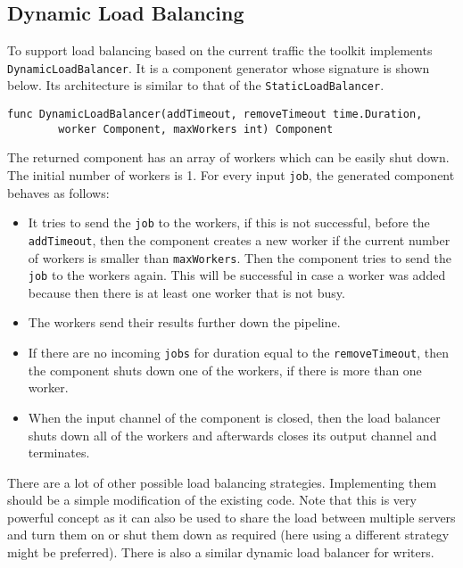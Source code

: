 \subsection{Dynamic Load Balancing}
To support load balancing based on the current traffic the toolkit implements
\texttt{DynamicLoadBalancer}. It is a component generator whose signature is
shown below. Its architecture is similar
to that of the \texttt{StaticLoadBalancer}.
\begin{lstlisting}
func DynamicLoadBalancer(addTimeout, removeTimeout time.Duration, 
        worker Component, maxWorkers int) Component
\end{lstlisting}
The returned component has an array of workers which can be easily shut down.
The initial number of workers is 1. 
For every input \texttt{job}, the generated component behaves as follows:
\begin{itemize}
	\item It tries to send the \texttt{job} to the workers, if this is not
          successful, before the \texttt{addTimeout}, then the component 
          creates a new worker if the current number of workers is smaller 
          than \texttt{maxWorkers}. Then the component tries to send the 
          \texttt{job} to the workers again. This will be successful in 
          case a worker was added because then there is at least one 
          worker that is not busy.

	\item The workers send their results further down the pipeline.

	\item If there are no incoming \texttt{jobs} for duration equal to the 
          \texttt{removeTimeout}, then the component shuts down one 
          of the workers, if there is more than one worker.

	\item When the input channel of the component is closed, then 
          the load balancer shuts down all of the workers and afterwards 
          closes its output channel and terminates.
\end{itemize}
There are a lot of other possible load balancing strategies. 
Implementing them should be a simple modification of the existing code.
Note that this is very powerful concept as it can also be used to share
the load between multiple servers and turn them on or shut them down as
required (here using a different strategy might be preferred). There is
also a similar dynamic load balancer for writers.

